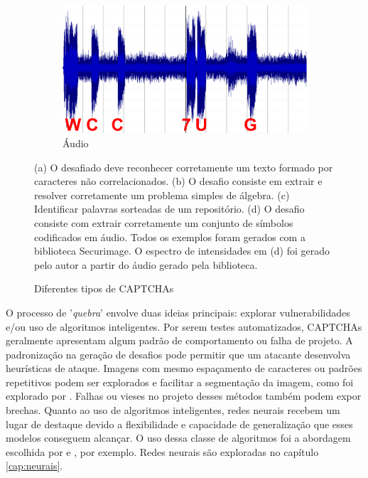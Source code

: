 \begin{figure}[ht]
\begin{subfigure}{.5\textwidth}
	\end{subfigure}
	\begin{subfigure}{.5\textwidth}
		\centering
		\includegraphics[width=.9\linewidth]{figuras/captcha_audio2.png}
		\caption{Áudio}
	\end{subfigure}
	\caption{Diferentes tipos de CAPTCHAs}
	\small (a) O desafiado deve reconhecer corretamente um texto formado por caracteres não correlacionados. (b) O desafio consiste em extrair e resolver corretamente um problema simples de álgebra. (c) Identificar palavras sorteadas de um repositório. (d) O desafio consiste com extrair corretamente um conjunto de símbolos codificados em áudio. Todos os exemplos foram gerados com a biblioteca Securimage. O espectro de intensidades em (d) foi gerado pelo autor a partir do áudio gerado pela biblioteca.
	\label{diffcaptchas}
\end{figure}

O processo de '\textit{quebra}' envolve duas ideias principais: explorar vulnerabilidades e/ou uso de algoritmos inteligentes. Por serem testes automatizados, CAPTCHAs geralmente apresentam algum padrão de comportamento ou falha de projeto. A padronização na geração de desafios pode permitir que um atacante desenvolva heurísticas de ataque. Imagens com mesmo espaçamento de caracteres ou padrões repetitivos podem ser explorados e facilitar a segmentação da imagem, como foi explorado por \cite{naivecaptcha}. Falhas ou vieses no projeto desses métodos também podem expor brechas. Quanto ao uso de algoritmos inteligentes, redes neurais recebem um lugar de destaque devido a flexibilidade e capacidade de generalização que esses modelos conseguem alcançar. O uso dessa classe de algoritmos foi a abordagem escolhida por \cite{captcha_break_2013} e \cite{lectures2005HIP}, por exemplo. Redes neurais são exploradas no capítulo \ref{cap:neurais}.

